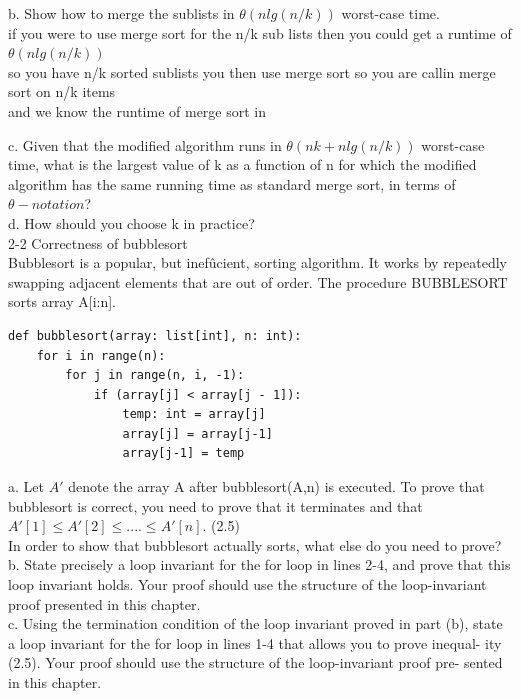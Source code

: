b. Show how to merge the sublists in $\theta(nlg(n/k))$ worst-case time. \\
if you were to use merge sort for the n/k sub lists then you could get a runtime of $\theta(nlg(n/k))$ \\
so you have n/k sorted sublists you then use merge sort so you are callin merge sort on n/k items \\
and we know the runtime of merge sort in 

c. Given that the modified algorithm runs in $\theta(nk + nlg(n/k))$ worst-case time, 
what is the largest value of k as a function of n for which the modified algorithm
has the same running time as standard merge sort, in terms of $\theta-notation$? \\

d. How should you choose k in practice? \\

2-2 Correctness of bubblesort \\
Bubblesort is a popular, but inefûcient, sorting algorithm. It works by repeatedly 
swapping adjacent elements that are out of order. The procedure BUBBLESORT 
sorts array A[i:n].
\begin{verbatim}
def bubblesort(array: list[int], n: int):
    for i in range(n):
        for j in range(n, i, -1):
            if (array[j] < array[j - 1]):
                temp: int = array[j]
                array[j] = array[j-1]
                array[j-1] = temp
\end{verbatim} 

a. Let $A'$ denote the array A after bubblesort(A,n) is executed. To prove that bubblesort is correct, you need to prove that it terminates and that 
$A'[1] \leq A'[2] \leq .... \leq A'[n]$. (2.5) \\
In order to show that bubblesort actually sorts, what else do you need to prove? \\

b. State precisely a loop invariant for the for loop in lines 2-4, and prove that this 
loop invariant holds. Your proof should use the structure of the loop-invariant 
proof presented in this chapter. \\

c. Using the termination condition of the loop invariant proved in part (b), state 
a loop invariant for the for loop in lines 1-4 that allows you to prove inequal- 
ity (2.5). Your proof should use the structure of the loop-invariant proof pre- 
sented in this chapter. \\

